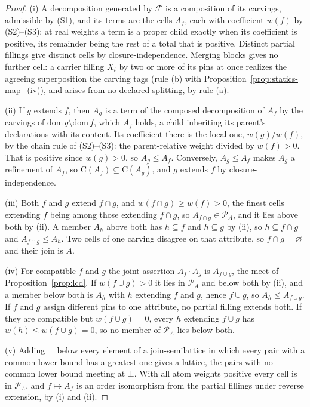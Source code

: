 \begin{proof}
(i) A decomposition generated by $\mathcal{F}$ is a composition of its carvings, admissible by (S1), and its terms are the cells $A_f$, each with coefficient $w(f)$ by (S2)--(S3); at real weights a term is a proper child exactly when its coefficient is positive, its remainder being the rest of a total that is positive. Distinct partial fillings give distinct cells by closure-independence. Merging blocks gives no further cell: a carrier filling $X_i$ by two or more of its pins at once realizes the agreeing superposition the carving tags (rule (b) with Proposition~\ref{prop:statics-map}~(iv)), and arises from no declared splitting, by rule (a).

(ii) If $g$ extends $f$, then $A_g$ is a term of the composed decomposition of $A_f$ by the carvings of $\mathrm{dom}\, g \setminus \mathrm{dom}\, f$, which $A_f$ holds, a child inheriting its parent's declarations with its content. Its coefficient there is the local one, $w(g)/w(f)$, by the chain rule of (S2)--(S3): the parent-relative weight divided by $w(f) > 0$. That is positive since $w(g) > 0$, so $A_g \le A_f$. Conversely, $A_g \le A_f$ makes $A_g$ a refinement of $A_f$, so $\mathrm{C}(A_f) \subseteq \mathrm{C}(A_g)$, and $g$ extends $f$ by closure-independence.

(iii) Both $f$ and $g$ extend $f \cap g$, and $w(f \cap g) \ge w(f) > 0$, the finest cells extending $f$ being among those extending $f \cap g$, so $A_{f \cap g} \in \mathcal{P}_A$, and it lies above both by (ii). A member $A_h$ above both has $h \subseteq f$ and $h \subseteq g$ by (ii), so $h \subseteq f \cap g$ and $A_{f \cap g} \le A_h$. Two cells of one carving disagree on that attribute, so $f \cap g = \varnothing$ and their join is $A$.

(iv) For compatible $f$ and $g$ the joint assertion $A_f \cdot A_g$ is $A_{f \cup g}$, the meet of Proposition~\ref{prop:lcd}. If $w(f \cup g) > 0$ it lies in $\mathcal{P}_A$ and below both by (ii), and a member below both is $A_h$ with $h$ extending $f$ and $g$, hence $f \cup g$, so $A_h \le A_{f \cup g}$. If $f$ and $g$ assign different pins to one attribute, no partial filling extends both. If they are compatible but $w(f \cup g) = 0$, every $h$ extending $f \cup g$ has $w(h) \le w(f \cup g) = 0$, so no member of $\mathcal{P}_A$ lies below both.

(v) Adding $\bot$ below every element of a join-semilattice in which every pair with a common lower bound has a greatest one gives a lattice, the pairs with no common lower bound meeting at $\bot$. With all atom weights positive every cell is in $\mathcal{P}_A$, and $f \mapsto A_f$ is an order isomorphism from the partial fillings under reverse extension, by (i) and (ii).
\end{proof}

